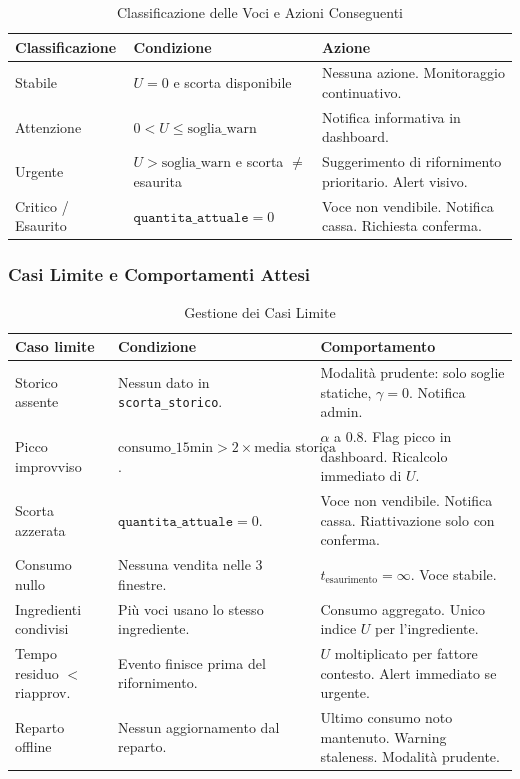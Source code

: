 \begin{table}[htbp]
\centering
\caption{Classificazione delle Voci e Azioni Conseguenti}
\label{tab:classificazione_notifica}
\small
\begin{tabularx}{\textwidth}{l>{\raggedright\arraybackslash}X>{\raggedright\arraybackslash}X}
\toprule
\textbf{Classificazione} & \textbf{Condizione} & \textbf{Azione} \\
\midrule
Stabile & $U = 0$ e scorta disponibile & Nessuna azione. Monitoraggio continuativo. \\
Attenzione & $0 < U \le \text{soglia\_warn}$ & Notifica informativa in dashboard. \\
Urgente & $U > \text{soglia\_warn}$ e scorta $\neq$ esaurita & Suggerimento di rifornimento prioritario. Alert visivo. \\
Critico / Esaurito & $\texttt{quantita\_attuale} = 0$ & Voce non vendibile. Notifica cassa. Richiesta conferma. \\
\bottomrule
\end{tabularx}
\end{table}

\subsubsection*{Casi Limite e Comportamenti Attesi}

\begin{table}[htbp]
\centering
\caption{Gestione dei Casi Limite}
\label{tab:casi_limite}
\small
\begin{tabularx}{\textwidth}{l>{\raggedright\arraybackslash}X>{\raggedright\arraybackslash}X}
\toprule
\textbf{Caso limite} & \textbf{Condizione} & \textbf{Comportamento} \\
\midrule
Storico assente & Nessun dato in \texttt{scorta\_storico}. & Modalità prudente: solo soglie statiche, $\gamma = 0$. Notifica admin. \\
Picco improvviso & $\text{consumo\_15min} > 2\times \text{media storica}$. & $\alpha$ a $0.8$. Flag picco in dashboard. Ricalcolo immediato di $U$. \\
Scorta azzerata & $\texttt{quantita\_attuale} = 0$. & Voce non vendibile. Notifica cassa. Riattivazione solo con conferma. \\
Consumo nullo & Nessuna vendita nelle 3 finestre. & $t_{\text{esaurimento}} = \infty$. Voce stabile. \\
Ingredienti condivisi & Più voci usano lo stesso ingrediente. & Consumo aggregato. Unico indice $U$ per l'ingrediente. \\
Tempo residuo $<$ riapprov. & Evento finisce prima del rifornimento. & $U$ moltiplicato per fattore contesto. Alert immediato se urgente. \\
Reparto offline & Nessun aggiornamento dal reparto. & Ultimo consumo noto mantenuto. Warning staleness. Modalità prudente. \\
\bottomrule
\end{tabularx}
\end{table}

